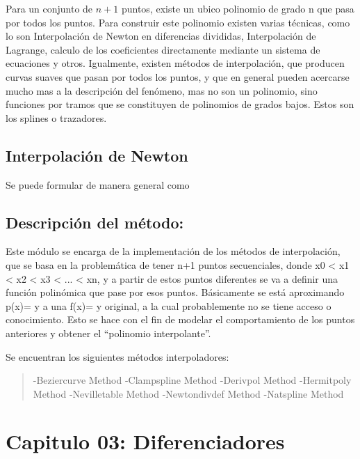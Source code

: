 \documentclass[letterpaper,10pt,oneside]{sphinxmanual}
\theoremstyle{plain}%
\theoremstyle{definition}%
\theoremstyle{remark}%
\begin{document}
\noindent Para un conjunto de $n + 1$ puntos, existe un ubico polinomio de grado n que pasa por todos los puntos. Para construir este polinomio existen varias técnicas, como lo son Interpolación de Newton en diferencias divididas, Interpolación de Lagrange, calculo de los coeficientes directamente mediante un sistema de ecuaciones y otros. Igualmente, existen métodos de interpolación, que producen curvas suaves que pasan por todos los puntos, y que en general pueden acercarse mucho mas a la descripción del fenómeno, mas no son un polinomio, sino funciones por tramos que se constituyen de polinomios de grados bajos. Estos son los splines o trazadores.\medskip

\section{Interpolación de Newton}

Se puede formular de manera general como

\section{Descripción del método:}
\label{chapter02:descripcion-del-metodo}
Este módulo se encarga de la implementación de los métodos de interpolación, que se basa en la problemática de tener n+1 puntos secuenciales,
donde x0 \textless{} x1 \textless{} x2 \textless{} x3 \textless{} ... \textless{} xn, y a partir de estos puntos diferentes se va a definir una función polinómica que pase por esos puntos.
Básicamente se está aproximando p(x)= y a una f(x)= y original, a la cual probablemente no se tiene acceso o conocimiento. Esto se hace con el fin
de modelar el comportamiento de los puntos anteriores y obtener el ``polinomio interpolante''.

Se encuentran los siguientes métodos interpoladores:
\begin{quote}

-Beziercurve Method
-Clampspline Method
-Derivpol Method
-Hermitpoly Method
-Nevilletable Method
-Newtondivdef Method
-Natspline Method
\end{quote}


\chapter{Capitulo 03: Diferenciadores}
\label{chapter03::doc}\label{chapter03:capitulo-03-diferenciadores}
\end{document}
